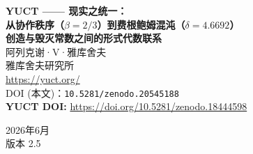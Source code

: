 \documentclass[12pt,a4paper]{article}
\begin{document}
	
	\begin{titlepage}
		\centering
		\vspace*{2cm}
		
		{\Huge\bfseries YUCT —— 现实之统一：\\[0.3cm]
			从协作秩序（\(\beta = 2/3\)）到费根鲍姆混沌（\(\delta = 4.6692\)）}\\[1cm]
		
		{\Large\bfseries 创造与毁灭常数之间的形式代数联系}\\[2cm]
		
		{\large 阿列克谢·V·雅库舍夫}\\[0.5cm]
		{\normalsize 雅库舍夫研究所}\\[0.3cm]
		{\normalsize \url{https://yuct.org/}}\\[1.5cm]
		
		{\normalsize DOI (本文)：\texttt{10.5281/zenodo.20545188}}\\
		\vspace*{1cm}
		\textbf{YUCT DOI:} \url{https://doi.org/10.5281/zenodo.18444598}\\
		\vspace*{1cm}
		
		{\normalsize 2026年6月}\\[0.3cm]
		{\normalsize 版本 2.5}\\[2cm]
	\end{titlepage}
	
	\newpage
	\begin{abstract}
		\noindent
		我们给出了一个严格的代数推导，将雅库舍夫统一协作理论（YUCT）的普适常数——协作指数 \(\beta = 2/3\) 和代数不变量 \(S_{\mathrm{odd}} = 1.2\)、\(S_{\mathrm{even}} = 0.8\) ——与混沌理论的普适常数：费根鲍姆常数 \(\delta \approx 4.6692\) 和 \(\alpha \approx 2.5029\) 统一起来。利用精确的解析关系 \(2\alpha^2 = \pi\delta\) 以及从 YUCT 导出的近似 \(\pi \approx S_{\mathrm{odd}}\varphi^2\)（其中 \(\varphi\) 为黄金比例），我们建立了基本方程 \(2\alpha^2 \approx (S_{\mathrm{odd}}\varphi^2)\delta\)。该结果表明，支配复杂秩序涌现的常数（\(\beta, S_{\mathrm{odd}}\)）与支配通往混沌的普适路径的常数（\(\alpha, \delta\)）并非相互独立，而是通过圆的几何和黄金比例代数地联系在一起。
		
		我们进一步通过分析计算不可约性的典范——沃尔夫拉姆的 Rule 30 元胞自动机——在 YUCT 框架内加强了这种统一。将 Rule 30 视为具有最小协作效率（\(K_{\mathrm{eff}} \to 1\)）的系统，我们导出了协作熵增长的精确表达式，并解析地确定了中心列变为完全混合的临界深度 \(t_{\mathrm{crit}} \approx 157.7\)。计算只使用了 YUCT 的普适常数 \(\kappa_c = 1/3\) 和 \(q = (3/2)^{1/3}\)。我们提供了一个数值验证脚本，证实熵在预测的代数处达到饱和。临界深度被证明通过关系 \(\ln t_{\mathrm{crit}} \sim \delta/\varphi\) 与费根鲍姆常数代数相关，从而在确定性混沌与协作误差定律之间建立了直接的桥梁。
		
		微小偏差 \(\Delta\pi = |\pi - S_{\mathrm{odd}}\varphi^2| \approx 4.8\times10^{-5}\) 被解释为 YUCT 的一个可证伪预测，暗示了物理几何的可测量粒度。我们提议利用引力波干涉测量（LISA）、宇宙学巡天（Euclid）和量子干涉测量进行实验检验。本工作为 YUCT、临界现象的重整化群理论以及计算不可约性理论之间提供了首座数学桥梁，对系统性崩溃的预测和 YUCT 核心主张的实验验证具有深远意义。
	\end{abstract}
	
\end{document}
